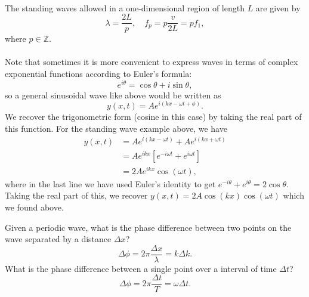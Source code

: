 \documentclass[../classical_mechanics.tex]{subfiles}
\begin{document}
        \paragraph{}
        The standing waves allowed in a one-dimensional region of length $L$ are given by
        \begin{equation}
            \lambda=\frac{2L}{p},\quad f_p=p\frac{v}{2L}=pf_1,
        \end{equation}
        where $p\in\mathbb{Z}$.

        \paragraph{}
        Note that sometimes it is more convenient to express waves in terms of complex exponential functions according to Euler's formula:
        \begin{equation}
            e^{i\theta}=\cos\theta+i\sin\theta,
        \end{equation}
        so a general sinusoidal wave like above would be written as
        \begin{equation}
            y(x,t)=Ae^{i(kx-\omega t+\phi)}.
        \end{equation}
        We recover the trigonometric form (cosine in this case) by taking the real part of this function.
        For the standing wave example above, we have
        \begin{align}
            y(x,t)&=Ae^{i(kx-\omega t)}+Ae^{i(kx+\omega t)}\\
            &=Ae^{ikx}\left[e^{-i\omega t}+e^{i\omega t}\right]\\
            &=2Ae^{ikx}\cos(\omega t),
        \end{align}
        where in the last line we have used Euler's identity to get $e^{-i\theta}+e^{i\theta}=2\cos\theta$.
        Taking the real part of this, we recover $y(x,t)=2A\cos(kx)\cos(\omega t)$ which we found above.
        \begin{example}
            Given a periodic wave, what is the phase difference between two points on the wave separated by a distance $\Delta x$?
            \begin{equation}
                \Delta\phi=2\pi\frac{\Delta x}{\lambda}=k\Delta k.
            \end{equation}
            What is the phase difference between a single point over a interval of time $\Delta t$?
            \begin{equation}
                \Delta\phi=2\pi\frac{\Delta t}{T}=\omega\Delta t.
            \end{equation}
        \end{example}
\end{document}
